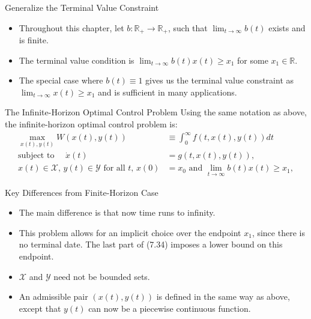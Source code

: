 \documentclass[9pt,aspectratio=169]{beamer}
\newcommand{\X}{\mathcal{X}}
\newcommand{\Y}{\mathcal{Y}}
\begin{document}
\begin{frame}{Generalize the Terminal Value Constraint}
\begin{itemize}
    \item Throughout this chapter, let $b : \mathbb{R}_+ \to \mathbb{R}_+$,
    such that $\lim_{t \to \infty} b(t)$ exists and is finite.
    \item The terminal value condition is $\lim_{t \to \infty} b(t)x(t) \geq
    x_1$ for some $x_1 \in \mathbb{R}$.
    \item The special case where $b(t) \equiv 1$ gives us the terminal value
    constraint as $\lim_{t \to \infty} x(t) \geq x_1$ and is sufficient in
    many applications.
\end{itemize}
\end{frame}

\begin{frame}{The Infinite-Horizon Optimal Control Problem}
Using the same notation as above, the infinite-horizon optimal control problem is:
\begin{align}
    \max_{x(t),y(t)} W(x(t), y(t)) &\equiv \int_0^{\infty} f(t, x(t), y(t))dt \tag{7.32}\\
    \text{subject to }\quad \dot{x}(t) &= g(t, x(t), y(t)), \tag{7.33}\\
    x(t)\in \X,\, y(t) \in \Y \text{ for all } t,\, x(0) &= x_0 \text{ and }
    \lim_{t \to \infty} b(t)x(t) \geq x_1, \tag{7.34}
\end{align}
\end{frame}

\begin{frame}{Key Differences from Finite-Horizon Case}
\begin{itemize}
    \item The main difference is that now time runs to infinity.
    \item This problem allows for an implicit choice over the endpoint $x_1$,
    since there is no terminal date. The last part of (7.34) imposes a lower
    bound on this endpoint.
    \item $\X$ and $\Y$ need not be bounded sets.
    \item An admissible pair $(x(t), y(t))$ is defined in the same way as
    above, except that $y(t)$ can now be a piecewise continuous function.
\end{itemize}
\end{frame}
\end{document}
